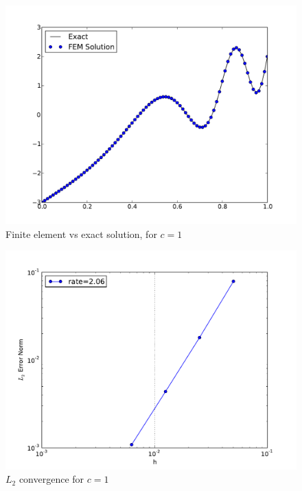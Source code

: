 \documentclass[10pt,letterpaper]{article}
\begin{document}
\begin{figure}[p]
\begin{center}
\includegraphics[width=5in]{c1.pdf}
\end{center}
\caption{Finite element vs exact solution, for $c=1$}
\label{fig:soln}
\end{figure}

\begin{figure}[p]
\begin{center}
\includegraphics[width=5in]{ec1.pdf}
\end{center}
\caption{$L_2$ convergence for $c=1$}
\end{figure}
\end{document}
